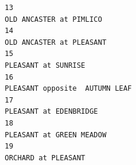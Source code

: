 \documentclass[
11pt, %
oneside, %
english, %
singlespacing, %
]{macthesis} %
\begin{document}
\begin{verbatim}
13                                                                                                                                                                                                                                                                                                                                                                                                        OLD ANCASTER at PIMLICO
14                                                                                                                                                                                                                                                                                                                                                                                                       OLD ANCASTER at PLEASANT
15                                                                                                                                                                                                                                                                                                                                                                                                            PLEASANT at SUNRISE
16                                                                                                                                                                                                                                                                                                                                                                                                 PLEASANT opposite  AUTUMN LEAF
17                                                                                                                                                                                                                                                                                                                                                                                                         PLEASANT at EDENBRIDGE
18                                                                                                                                                                                                                                                                                                                                                                                                       PLEASANT at GREEN MEADOW
19                                                                                                                                                                                                                                                                                                                                                                                                            ORCHARD at PLEASANT

\end{verbatim}
\end{document}
